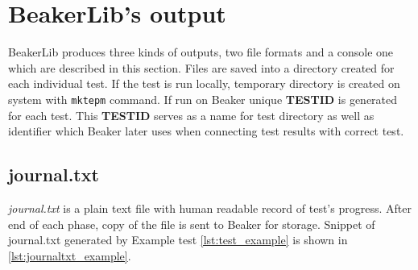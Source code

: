 \section{BeakerLib's output}
BeakerLib produces three kinds of outputs, two file formats and a console one which are described in this section. Files are saved into a directory created for each individual test. If the test is run locally, temporary directory is created on system with \texttt{mktepm} command. If run on Beaker unique \textbf{TESTID} is generated for each test. This \textbf{TESTID} serves as a name for test directory as well as identifier which Beaker later uses when connecting test results with correct test.

\subsection{journal.txt}
\textit{journal.txt} is a plain text file with human readable record of test's progress. After end of each phase, copy of the file is sent to Beaker for storage. Snippet of journal.txt generated by Example test \ref{lst:test_example} is shown in \ref{lst:journaltxt_example}.


